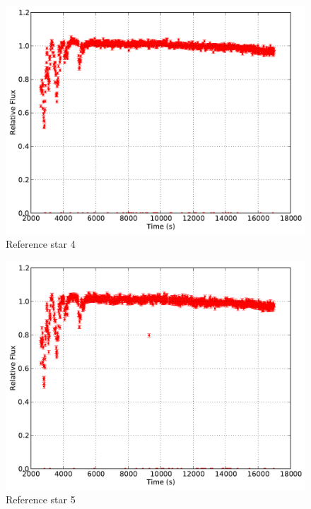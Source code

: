\documentclass{aastex61}
\begin{document}
\begin{figure}[h]
	\centering
	\includegraphics[scale = .45]{exo_curves4.pdf}
	\caption{Reference star 4}
	\label{fig: refcurve4}
\end{figure}
\begin{figure}[h]
	\centering
	\includegraphics[scale = .45]{exo_curves5.pdf}
	\caption{Reference star 5}
	\label{fig: refcurve5}
\end{figure}
\end{document}
